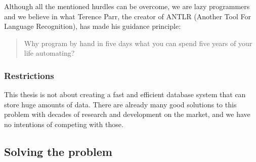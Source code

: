 Although all the mentioned hurdles can be overcome, we are lazy programmers
and we believe in what Terence Parr, the creator of ANTLR (Another
Tool For Language Recognition), has made his guidance principle: 
\begin{quotation}
Why program by hand in five days what you can spend five years of
your life automating?
\end{quotation}

\subsubsection{Restrictions}

This thesis is not about creating a fast and efficient database system
that can store huge amounts of data. There are already many good solutions
to this problem with decades of research and development on the market,
and we have no intentions of competing with those.


\subsection{Solving the problem}

